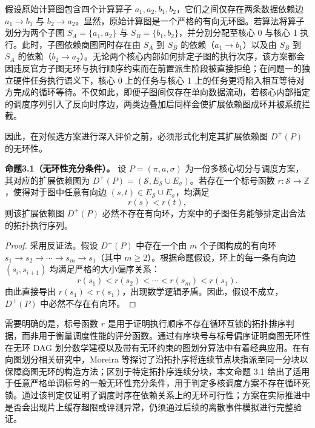 \documentclass[anonymous,withtoc]{gmcm2026}
\begin{document}
假设原始计算图包含四个计算算子 \(a_1, a_2, b_1, b_2\)，它们之间仅存在两条数据依赖边 \(a_1 \to b_1\) 与 \(b_2 \to a_2\)。显然，原始计算图是一个严格的有向无环图。若算法将算子划分为两个子图 \(S_A = \{a_1, a_2\}\) 与 \(S_B = \{b_1, b_2\}\)，并分别分配至核心 0 与核心 1 执行。此时，子图依赖商图同时存在由 \(S_A\) 到 \(S_B\) 的依赖（\(a_1 \to b_1\)）以及由 \(S_B\) 到 \(S_A\) 的依赖（\(b_2 \to a_2\)）。无论两个核心内部如何排定子图的执行次序，该方案都会因违反官方子图无环与执行顺序约束而在前置派生阶段被直接拒绝；在问题一的独立硬件任务执行语义下，核心 0 上的任务与核心 1 上的任务更将陷入相互等待对方完成的循环等待。不仅如此，即便子图间仅存在单向数据流动，若核心内部指定的调度序列引入了反向时序边，两类边叠加后同样会使扩展依赖图成环并被系统拦截。

因此，在对候选方案进行深入评价之前，必须形式化判定其扩展依赖图 \(D^+(P)\) 的无环性。

\textbf{命题3.1（无环性充分条件）。} 设 \(P = (\pi, a, \sigma)\) 为一份多核心切分与调度方案，其对应的扩展依赖图为 \(D^+(P) = (\mathcal{S}, E_{\mathcal{S}} \cup E_\sigma)\)。若存在一个标号函数 \(r: \mathcal{S} \to \mathbb{Z}\)，使得对于图中任意有向边 \((s, t) \in E_{\mathcal{S}} \cup E_\sigma\)，均满足 \begin{equation}
r(s) < r(t),
\end{equation} 则该扩展依赖图 \(D^+(P)\) 必然不存在有向环，方案中的子图任务能够排定出合法的拓扑执行序列。

\begin{proof} 采用反证法。假设 \(D^+(P)\) 中存在一个由 \(m\) 个子图构成的有向环 \(s_1 \to s_2 \to \cdots \to s_m \to s_1\)（其中 \(m \ge 2\)）。根据命题假设，环上的每一条有向边 \((s_i, s_{i+1})\) 均满足严格的大小偏序关系： \begin{equation}
r(s_1) < r(s_2) < \cdots < r(s_m) < r(s_1).
\end{equation} 由此直接导出 \(r(s_1) < r(s_1)\)，出现数学逻辑矛盾。因此，假设不成立，\(D^+(P)\) 中必然不存在有向环。 \end{proof}

需要明确的是，标号函数 \(r\) 是用于证明执行顺序不存在循环互锁的拓扑排序判据，而非用于衡量调度性能的评分函数。通过有序块号与标号偏序证明商图无环性在无环 DAG 划分数学建模\cite{ref7}以及带有无环约束的图划分算法\cite{ref18}中有着经典应用。在有向图划分相关研究中，Moreira 等\cite{ref18}探讨了沿拓扑序将连续节点块指派至同一分块以保障商图无环的构造方法；区别于特定拓扑序连续分块，本文命题 3.1 给出了适用于任意严格单调标号的一般无环性充分条件，用于判定多核调度方案不存在循环死锁。通过该判定仅证明了调度时序在依赖关系上的无环可行性；方案在实际推进中是否会出现片上缓存超限或评测异常，仍须通过后续的离散事件模拟进行完整验证。
\end{document}
